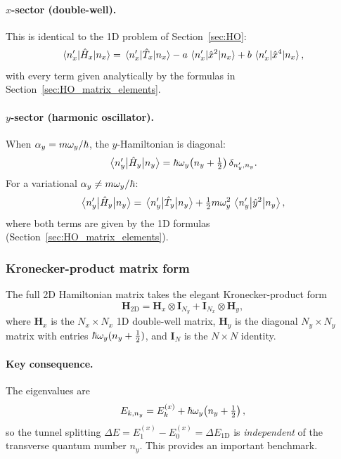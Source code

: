 \paragraph{$x$-sector (double-well).}
This is identical to the 1D problem of Section~\ref{sec:HO}:
\begin{equation}\label{eq:Hx_element}
    \mel{n'_x}{\hat{H}_x}{n_x} = \mel{n'_x}{\hat{T}_x}{n_x}
    - a\,\mel{n'_x}{\hat{x}^2}{n_x}
    + b\,\mel{n'_x}{\hat{x}^4}{n_x},
\end{equation}
with every term given analytically by the formulas in
Section~\ref{sec:HO_matrix_elements}.

\paragraph{$y$-sector (harmonic oscillator).}
When $\alpha_y = m\omega_y/\hbar$, the $y$-Hamiltonian is diagonal:
\begin{equation}\label{eq:Hy_exact}
    \mel{n'_y}{\hat{H}_y}{n_y} = \hbar\omega_y\!\left(n_y + \tfrac{1}{2}\right)
    \delta_{n'_y, n_y}.
\end{equation}
For a variational $\alpha_y \neq m\omega_y/\hbar$:
\begin{equation}\label{eq:Hy_variational}
    \mel{n'_y}{\hat{H}_y}{n_y}
    = \mel{n'_y}{\hat{T}_y}{n_y}
    + \tfrac{1}{2}m\omega_y^2\,\mel{n'_y}{\hat{y}^2}{n_y},
\end{equation}
where both terms are given by the 1D formulas (Section~\ref{sec:HO_matrix_elements}).

\subsubsection{Kronecker-product matrix form}

The full 2D Hamiltonian matrix takes the elegant Kronecker-product form
\begin{equation}\label{eq:H_kron}
    \mathbf{H}_\mathrm{2D} = \mathbf{H}_x \otimes \mathbf{I}_{N_y}
    + \mathbf{I}_{N_x} \otimes \mathbf{H}_y,
\end{equation}
where $\mathbf{H}_x$ is the $N_x \times N_x$ 1D double-well matrix,
$\mathbf{H}_y$ is the diagonal $N_y \times N_y$ matrix with entries
$\hbar\omega_y(n_y + \tfrac{1}{2})$, and $\mathbf{I}_N$ is the $N\times N$
identity.

\paragraph{Key consequence.}
The eigenvalues are
\begin{equation}\label{eq:sep_eigenvalues}
    E_{k, n_y} = E_k^{(x)} + \hbar\omega_y\!\left(n_y + \tfrac{1}{2}\right),
\end{equation}
so the tunnel splitting $\Delta E = E_1^{(x)} - E_0^{(x)} = \Delta E_\mathrm{1D}$
is \emph{independent} of the transverse quantum number $n_y$.  This provides
an important benchmark.

